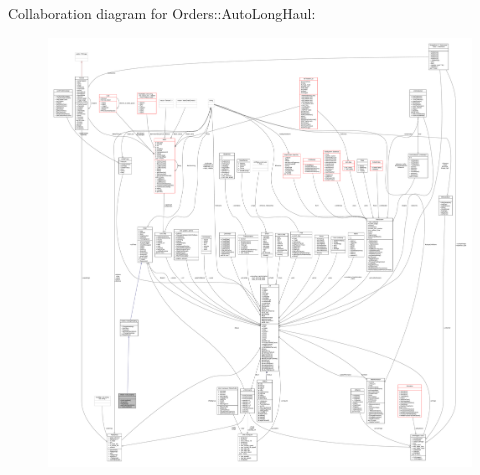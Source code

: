 Collaboration diagram for Orders\+:\+:Auto\+Long\+Haul\+:
\nopagebreak
\begin{figure}[H]
\begin{center}
\leavevmode
\includegraphics[width=350pt]{dd/d6a/classOrders_1_1AutoLongHaul__coll__graph}
\end{center}
\end{figure}
